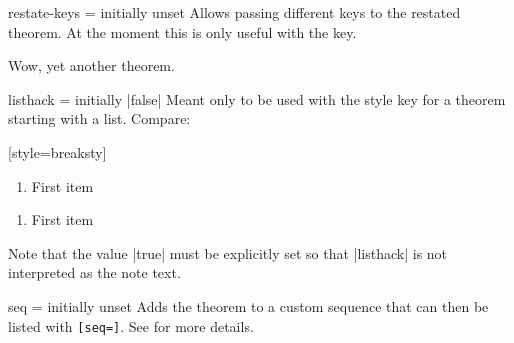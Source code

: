 \documentclass{ltxdoc}
\newcommand{\bracks}[1]{\texttt{[#1]}}
\begin{document}
\begin{docKey}{restate-keys}
  {=}
  {initially unset}
Allows passing different keys to the restated theorem.
At the moment this is only useful with the  key.

\begin{keythmscode}[]
\begin{theorem}[
  store=rktest,
  note=ORIGINAL,
  restate-keys={note=RESTATED}]
Wow, yet another theorem.
\end{theorem}
\end{keythmscode}

\end{docKey}

\begin{docKey}{listhack}
  {=\textbar{}}
  {initially |false|}
Meant only to be used with the  style key for a theorem starting with a list.
Compare:

\begin{tcbwritetemp}
[style=breaksty]
\end{tcbwritetemp}

\begin{keythmscode}[withpreamble]
\begin{observation}
\begin{enumerate}
\item First item
\end{enumerate}
\end{observation}

\begin{observation}[listhack=true]
\begin{enumerate}
\item First item
\end{enumerate}
\end{observation}
\end{keythmscode}

Note that the value |true| must be explicitly set so that |listhack| is not interpreted as the note text.
\end{docKey}

\begin{docKey}[][doc label=thm/seq]{seq}
  {=}
  {initially unset}
Adds the theorem to a custom sequence  that can then be listed with \bracks{seq=}.
See  for more details.
\end{docKey}
\end{document}
